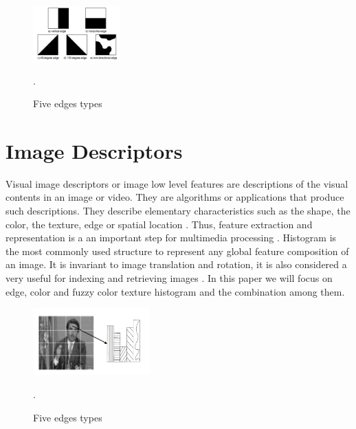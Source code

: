 \documentclass[11pt]{article}
\begin{document}
\begin{figure}[h]
\centering
\includegraphics[width=0.3\textwidth]{edgesTypes}
\caption{Five edges types}.
\label{fig:edgesTypes}
\end{figure}

\section{Image Descriptors}

Visual image descriptors or image low level features are descriptions of the visual contents in an image or video. They are algorithms or applications that produce such descriptions. They describe elementary characteristics such as the shape, the color, the texture, edge or spatial location \cite{goshtasby2012image}. Thus, feature extraction and representation is a an important step for multimedia processing \cite{Tian2013ARO}. Histogram is the most commonly used structure to represent any global feature composition of an image. It is invariant to image translation and rotation, it is also considered a very useful for indexing and retrieving images \cite{Dr2010EfficientUO, park2000efficient, balasubramani2009efficient}. In this paper we will focus on edge, color and fuzzy color texture histogram and the combination among them.

\begin{figure}[h]
\centering
\includegraphics[width=0.4\textwidth]{edgesInImageSubBlock}
\caption{Five edges types}.
\label{fig:edgesInImageSubBlock}
\end{figure}
\end{document}
